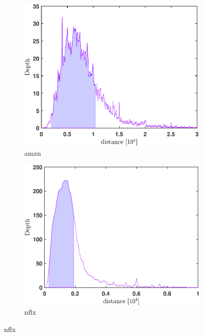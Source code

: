 \documentclass[11pt, a4paper]{thesis}  %
\begin{document}
\begin{figure}[htp]	
	
	\centering
	\begin{subfigure}[b]{0.5\textwidth}
    	\includegraphics[width=\textwidth]{./AverageDepthProfile/AMZN/average_depth_profile.pdf}
		\caption{\ac{amzn}}
        \label{figure:average_depth:amzn}
	\end{subfigure}
	
	\begin{subfigure}[b]{0.5\textwidth}
    	\includegraphics[width=\textwidth]{./AverageDepthProfile/NFLX/average_depth_profile.pdf}
		\caption{\ac{nflx}}
        \label{figure:average_depth:nflx}
	\end{subfigure}
	

\end{figure}
\end{document}
